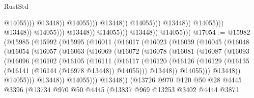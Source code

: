 \begin{lexlean}{RustStd}
\begin{coremodule}
                                                                      @14055)))
                                                                @13448))
                                                            @14055)))
                                                      @13448))
                                                  @14055)))
                                            @13448))
                                        @14055)))
                                  @13448))
                              @14055)))
                        @13448))
                    @14055)))
              @13448))
          @14055)))
@17054 := @15982
    (@15985
      (@15992
        (@15995
          (@16011
            (@16017
              (@16023
                (@16039
                  (@16045
                    (@16048
                      (@16054
                        (@16057
                          (@16063
                            (@16069
                              (@16072
                                (@16078
                                  (@16081
                                    (@16087
                                      (@16093
                                        (@16096
                                          (@16102
                                            (@16105
                                              (@16111
                                                (@16117
                                                  (@16120
                                                    (@16126
                                                      (@16129
                                                        (@16135
                                                          (@16141 (@16144 (@16978 @13448)) @14055)))
                                                      @13448))
                                                  @14055)))
                                            @13448))
                                        @14055)))
                                  @13448))
                              @14055)))
                        @13448))
                    (@13726
                      @970
                      @120
                      @50
                      @28
                      @4445
                      @3396
                      (@13734
                        @970
                        @50
                        @4445
                        (@13837
                          @969
                          @13253
                          @3402
                          @4444
                          @3871

\end{coremodule}
\end{lexlean}
